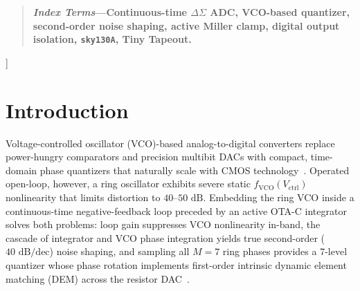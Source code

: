 \documentclass[10pt,twocolumn,letterpaper]{article}
\begin{document}
{\begin{quote}
\vspace{2pt}
\textbf{\textit{Index Terms}---Continuous-time $\Delta\Sigma$ ADC, VCO-based quantizer, second-order noise shaping, active Miller clamp, digital output isolation, \textup{\texttt{sky130A}}, Tiny Tapeout.}
\end{quote}
\vspace{2pt}
}]

\section{Introduction}
Voltage-controlled oscillator (VCO)-based analog-to-digital converters replace power-hungry comparators and precision multibit DACs with compact, time-domain phase quantizers that naturally scale with CMOS technology~\cite{straayer2008,taylor2010}. Operated open-loop, however, a ring oscillator exhibits severe static $f_{\text{VCO}}(V_{\text{ctrl}})$ nonlinearity that limits distortion to $40$--$50\text{ dB}$. Embedding the ring VCO inside a continuous-time negative-feedback loop preceded by an active OTA-C integrator solves both problems: loop gain suppresses VCO nonlinearity in-band, the cascade of integrator and VCO phase integration yields true second-order ($40\text{ dB/dec}$) noise shaping, and sampling all $M=7$ ring phases provides a 7-level quantizer whose phase rotation implements first-order intrinsic dynamic element matching (DEM) across the resistor DAC~\cite{straayer2008,xing2015}.
\end{document}
